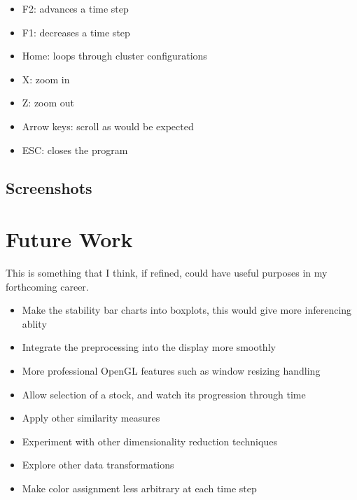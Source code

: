 \documentclass{article}
\begin{document}
\begin{multicols}{2}
\begin{itemize}
	\item F2: advances a time step
	\item F1: decreases a time step
	\item Home: loops through cluster configurations
	\item X: zoom in
	\item Z: zoom out
	\item Arrow keys: scroll as would be expected
	\item ESC: closes the program
\end{itemize}

\subsection{Screenshots}



\section{Future Work}
This is something that I think, if refined, could have useful purposes in my forthcoming career.
\begin{itemize}
 \item Make the stability bar charts into boxplots, this would give more inferencing ablity
 \item Integrate the preprocessing into the display more smoothly
 \item More professional OpenGL features such as window resizing handling
 \item Allow selection of a stock, and watch its progression through time
 \item Apply other similarity measures
 \item Experiment with other dimensionality reduction techniques
 \item Explore other data transformations
 \item Make color assignment less arbitrary at each time step
\end{itemize}


\end{multicols}
\end{document}
